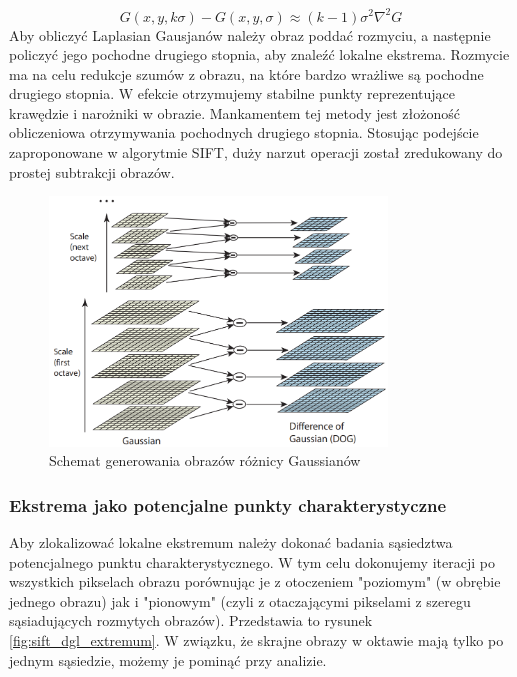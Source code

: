 \begin{equation}
G(x,y,k\sigma)-G(x,y,\sigma) \approx (k-1)\sigma^2{\nabla}^2 G
\end{equation}
Aby obliczyć Laplasian Gausjanów należy obraz poddać rozmyciu, a następnie policzyć jego pochodne drugiego stopnia, aby znaleźć lokalne ekstrema. Rozmycie ma na celu redukcje szumów z obrazu, na które bardzo wrażliwe są pochodne drugiego stopnia. W efekcie otrzymujemy stabilne punkty reprezentujące krawędzie i narożniki w obrazie. Mankamentem tej metody jest złożoność obliczeniowa otrzymywania pochodnych drugiego stopnia. Stosując podejście zaproponowane w algorytmie SIFT, duży narzut operacji został zredukowany do prostej subtrakcji obrazów.
\begin{figure}[!htb]
\centering
\includegraphics[width=0.8\textwidth]{pict/02/sift/sift_dgl_octave.png}
\caption{Schemat generowania obrazów różnicy Gaussianów}
\label{fig:sift_dgl_octave}
\end{figure}

\subsubsection{Ekstrema jako potencjalne punkty charakterystyczne}
Aby zlokalizować lokalne ekstremum należy dokonać badania sąsiedztwa potencjalnego punktu charakterystycznego. W tym celu dokonujemy iteracji po wszystkich pikselach obrazu porównując je z otoczeniem "poziomym" (w obrębie jednego obrazu) jak i "pionowym" (czyli z otaczającymi pikselami z szeregu sąsiadujących rozmytych obrazów). Przedstawia to rysunek \ref{fig:sift_dgl_extremum}. W związku, że skrajne obrazy w oktawie mają tylko po jednym sąsiedzie, możemy je pominąć przy analizie.

